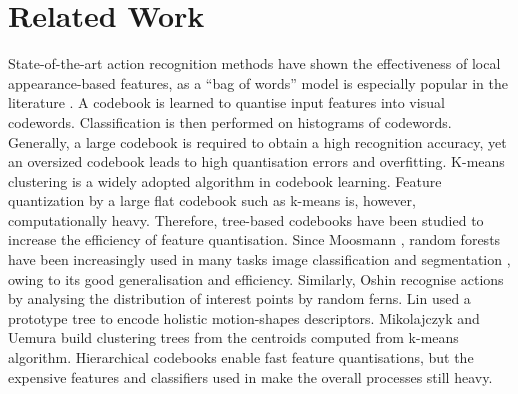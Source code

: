\section{Related Work}
\label{sec/act/relatedwork}
State-of-the-art action recognition methods have shown the effectiveness of local appearance-based features, as a ``bag of words'' model is especially popular in the literature \cite{Dollar2005, Riemenschneider2009, Niebles2008, Schuldt2004, Wong2007}. A codebook is learned to quantise input features into visual codewords. Classification is then performed on histograms of codewords. Generally, a large codebook is required to obtain a high recognition accuracy, yet an oversized codebook leads to high quantisation errors and overfitting. K-means clustering is a widely adopted algorithm in codebook learning. Feature quantization by a large flat codebook such as k-means is, however, computationally heavy. Therefore, tree-based codebooks have been studied to increase the efficiency of feature quantisation. 
Since Moosmann \etal \cite{Moosmann2007}, random forests have been increasingly used in many tasks \eg image classification and segmentation \cite{Shotton2008}, owing to its good generalisation and efficiency. Similarly, Oshin \etal \cite{Oshin2009} recognise actions by analysing the distribution of interest points by random ferns. Lin \etal \cite{Lin2009} used a prototype tree to encode holistic motion-shapes descriptors. Mikolajczyk and Uemura \cite{Mikolajczyk2008} build clustering trees from the centroids computed from k-means algorithm. 
Hierarchical codebooks enable fast feature quantisations, but the expensive features and classifiers used in \cite{Lin2009,Mikolajczyk2008} make the overall processes still heavy.

